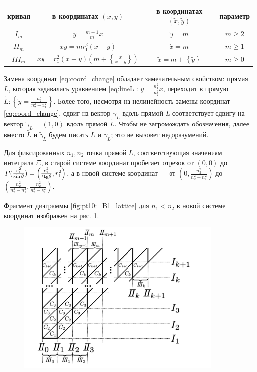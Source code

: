 \begin{center}
\begin{tabular}{|c|c|c|c|}
\hline 
кривая & в координатах $(x,y)$  	& 	в координатах $(\widetilde{x},\widetilde{y})$				& 	параметр\\ \hline 
\hline 
$I_m$ 		& 	$y = \frac{m-1}{m} x$ 	& $\widetilde{y} = m$  		&	$m \geq 2$ \\ \hline 
$II_m$ 		&	$x y = m r_1^2 (x-y)$  	& $\widetilde{x}= m$ 		&	$m \geq 1$ \\ \hline 
$III_m$ 		&	$x y = r_1^2 (x-y) \left( m + \left\{\frac{x}{x-y}\right\}\right)$  & $\widetilde{x} = m + \left\{ \widetilde{y} \right\}$  	&	$m \geq 0$ \\ \hline 
\end{tabular}
\end{center}
Замена координат \eqref{eq:coord_change} обладает замечательным свойством: прямая $L$, которая задавалась уравнением \eqref{eq:lineL}: $y=\frac{n_1^2}{n_2^2} x$, переходит в прямую $\widetilde{L}: \left\{\widetilde{y} = \frac{n_2^2}{n_2^2-n_1^2} \right\}$.
Более того, несмотря на нелинейность замены координат \eqref{eq:coord_change}, сдвиг на вектор ${\gamma}_L$ вдоль прямой $L$ соответствует сдвигу на вектор $\widetilde{\gamma}_L = (1,0)$ вдоль прямой $\widetilde{L}$.
Чтобы не загромождать обозначения, далее вместо  $\widetilde{L}$ и $\widetilde{\gamma}_L$  будем  писать $L$ и $\gamma_L$; это не вызовет недоразумений.

Для фиксированных $n_1,n_2$ точка прямой $L$, соответствующая значениям интеграла $\Xi$, в старой системе координат пробегает отрезок от $(0, 0)$ до $P(\frac{r_1^2}{\sin \theta}) = \left(\frac{r_1^2}{\tg \theta}, r_1^2\right)$, а в новой системе координат --- от $\left(0,\frac{n_2^2}{n_2^2-n_1^2}\right)$ до $\left(\frac{n_2^2}{n_2^2-n_1^2}, \frac{n_2^2}{n_2^2-n_1^2}\right)$.

Фрагмент диаграммы  \ref{fig:pt10:_B1_lattice} для $n_1 < n_2$ в новой системе координат изображен на рис. \ref{fig:pt10:_B1_lattice_straight}.
\begin{figure}[!htb]
\centering
\includegraphics[width=10cm]{images/ch4/section3_circular/B1_lattice_straight.pdf}
    \caption{}
    \label{fig:pt10:_B1_lattice_straight}
\end{figure}

